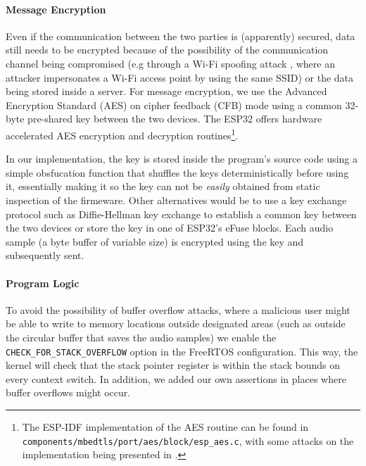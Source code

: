 \documentclass[conference]{IEEEtran}
\begin{document}
\paragraph{Message Encryption}

Even if the communication between the two parties is (apparently) secured, data still needs to be encrypted because of the possibility 
of the communication channel being compromised (e.g through a Wi-Fi spoofing attack \cite{WifiSpoofing}, where an attacker 
impersonates a Wi-Fi access point by using the same SSID) or the data being stored inside a server.
For message encryption, we use the Advanced Encryption Standard (AES) on cipher feedback (CFB) mode using 
a common 32-byte pre-shared key between the two devices.
The ESP32 offers hardware accelerated AES encryption and decryption routines\footnote{The ESP-IDF implementation of the AES routine can be found in \texttt{components/mbedtls/port/aes/block/esp\_aes.c},
with some attacks on the implementation being presented in \cite{PwnEsp32Crypto}.}.

In our implementation, the key is stored inside the program's source code using 
a simple obsfucation function that shuffles the keys deterministically before using it, essentially
making it so the key can not be \textit{easily} obtained from static inspection of the firmeware.
Other alternatives would be to use a key exchange protocol such as Diffie-Hellman key exchange\cite{DiffieHellmanKeyExchange} to 
establish a common key between the two devices or store the key in one of ESP32's eFuse blocks.
Each audio sample (a byte buffer of variable size) is encrypted using the key 
and subsequently sent.

\paragraph{Program Logic}

To avoid the possibility of buffer overflow attacks, where a malicious user might be able 
to write to memory locations outside designated areas (such as outside the circular buffer that saves
the audio samples) we enable the \texttt{CHECK\_FOR\_STACK\_OVERFLOW} option in the FreeRTOS configuration.
This way, the kernel will check that the stack pointer register is within the stack bounds on every context switch.
In addition, we added our own assertions in places where buffer overflows might occur.
\end{document}
